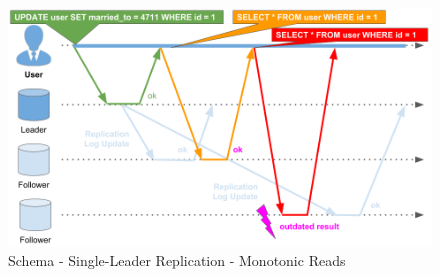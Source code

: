 {\begin{figure}[H]
	\centering
  \includegraphics[width=1\textwidth]{replication_schema_sl_monotonic_reads.png}
	\caption{Schema - Single-Leader Replication - Monotonic Reads}
	\label{schema_replication_sl_monotonic_reads}
\end{figure}

}
